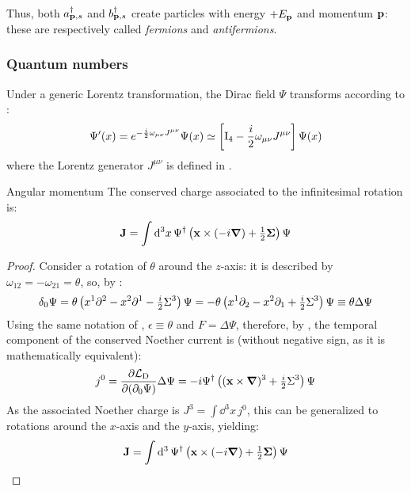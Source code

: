 Thus, both $ a_{\mathbf{p},s}^\dagger $ and $ b_{\mathbf{p},s}^\dagger $ create particles with energy $ +E_{\mathbf{p}} $ and momentum $ \mathbf{p} $: these are respectively called \textit{fermions} and \textit{antifermions}.

\subsubsection{Quantum numbers}

Under a generic Lorentz transformation, the Dirac field $ \Psi $ transforms according to :
\begin{equation}
  \Psi'(x) = e^{-\frac{i}{2} \omega_{\mu \nu} J^{\mu \nu}} \Psi(x) \simeq \left[ \mathrm{I}_4 - \frac{i}{2} \omega_{\mu \nu} J^{\mu \nu} \right] \Psi(x)
  \label{eq:dirac-inf-rot}
\end{equation}
where the Lorentz generator $ J^{\mu \nu} $ is defined in .

\begin{proposition}{Angular momentum}{}
  The conserved charge associated to the infinitesimal rotation  is:
  \begin{equation}
    \mathbf{J} = \int \mathrm{d}^3x\, \Psi^\dagger \left( \mathbf{x} \times (-i \boldsymbol{\nabla}) + \tfrac{1}{2} \boldsymbol{\Sigma} \right) \Psi
  \end{equation}
\end{proposition}

\begin{proofbox}
  \begin{proof}
    Consider a rotation of $ \theta $ around the $ z $-axis: it is described by $ \omega_{12} = - \omega_{21} = \theta $, so, by :
    \begin{equation*}
      \delta_0 \Psi = \theta \left( x^1 \partial^2 - x^2 \partial^1 - \tfrac{i}{2} \Sigma^3 \right) \Psi = - \theta \left( x^1 \partial_2 - x^2 \partial_1 + \tfrac{i}{2} \Sigma^3 \right) \Psi \equiv \theta \Delta \Psi
    \end{equation*}
    Using the same notation of , $ \epsilon \equiv \theta $ and $ F = \Delta \Psi $, therefore, by , the temporal component of the conserved Noether current is (without negative sign, as it is mathematically equivalent):
    \begin{equation*}
      j^0 = \frac{\partial \mathcal{L}_\text{D}}{\partial (\partial_0 \Psi)} \Delta \Psi = - i \Psi^\dagger \left( (\mathbf{x} \times \boldsymbol{\nabla})^3 + \tfrac{i}{2} \Sigma^3 \right) \Psi
    \end{equation*}
    As the associated Noether charge is $ J^3 = \int \dd^3x\, j^0 $, this can be generalized to rotations around the $ x $-axis and the $ y $-axis, yielding:
    \begin{equation*}
      \mathbf{J} = \int \mathrm{d}^3\, \Psi^\dagger \left( \mathbf{x} \times (-i \boldsymbol{\nabla}) + \tfrac{1}{2} \boldsymbol{\Sigma} \right) \Psi
    \end{equation*}
  \end{proof}
\end{proofbox}

